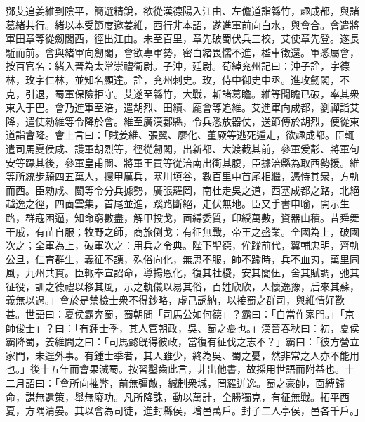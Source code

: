 \begin{pinyinscope}
鄧艾追姜維到陰平，簡選精銳，欲從漢德陽入江由、左儋道詣緜竹，趣成都，與諸葛緒共行。緒以本受節度邀姜維，西行非本詔，遂進軍前向白水，與會合。會遣將軍田章等從劒閣西，徑出江由。未至百里，章先破蜀伏兵三校，艾使章先登。遂長駈而前。會與緒軍向劒閣，會欲專軍勢，密白緒畏懦不進，檻車徵還。軍悉屬會，按百官名：緒入晉為太常崇禮衞尉。子沖，廷尉。荀綽兖州記曰：沖子詮，字德林，玫字仁林，並知名顯達。詮，兖州刺史。玫，侍中御史中丞。進攻劒閣，不克，引退，蜀軍保險拒守。艾遂至緜竹，大戰，斬諸葛瞻。維等聞瞻已破，率其衆東入于巴。會乃進軍至涪，遣胡烈、田續、龐會等追維。艾進軍向成都，劉禪詣艾降，遣使勑維等令降於會。維至廣漢郪縣，令兵悉放器仗，送節傳於胡烈，便從東道詣會降。會上言曰：「賊姜維、張翼、廖化、董厥等逃死遁走，欲趣成都。臣輒遣司馬夏侯咸、護軍胡烈等，徑從劒閣，出新都、大渡截其前，參軍爰𩇕、將軍句安等躡其後，參軍皇甫闓、將軍王買等從涪南出衝其腹，臣據涪縣為取西勢援。維等所統步騎四五萬人，擐甲厲兵，塞川填谷，數百里中首尾相繼，憑恃其衆，方軌而西。臣勑咸、闓等令分兵據勢，廣張羅罔，南杜走吳之道，西塞成都之路，北絕越逸之徑，四靣雲集，首尾並進，蹊路斷絕，走伏無地。臣又手書申喻，開示生路，群寇困逼，知命窮數盡，解甲投戈，靣縛委質，印綬萬數，資器山積。昔舜舞干戚，有苗自服；牧野之師，商旅倒戈：有征無戰，帝王之盛業。全國為上，破國次之；全軍為上，破軍次之：用兵之令典。陛下聖德，侔蹤前代，翼輔忠明，齊軌公旦，仁育群生，義征不譓，殊俗向化，無思不服，師不踰時，兵不血刃，萬里同風，九州共貫。臣輙奉宣詔命，導揚恩化，復其社稷，安其閭伍，舍其賦調，弛其征役，訓之德禮以移其風，示之軌儀以易其俗，百姓欣欣，人懷逸豫，后來其蘇，義無以過。」會於是禁檢士衆不得鈔略，虛己誘納，以接蜀之群司，與維情好歡甚。世語曰：夏侯霸奔蜀，蜀朝問「司馬公如何德」？霸曰：「自當作家門。」「京師俊士」？曰：「有鍾士季，其人管朝政，吳、蜀之憂也。」漢晉春秋曰：初，夏侯霸降蜀，姜維問之曰：「司馬懿旣得彼政，當復有征伐之志不？」霸曰：「彼方營立家門，未遑外事。有鍾士季者，其人雖少，終為吳、蜀之憂，然非常之人亦不能用也。」後十五年而會果滅蜀。按習鑿齒此言，非出他書，故採用世語而附益也。十二月詔曰：「會所向摧弊，前無彊敵，緘制衆城，罔羅迸逸。蜀之豪帥，靣縛歸命，謀無遺策，舉無廢功。凡所降誅，動以萬計，全勝獨克，有征無戰。拓平西夏，方隅清晏。其以會為司徒，進封縣侯，增邑萬戶。封子二人亭侯，邑各千戶。」


\end{pinyinscope}
